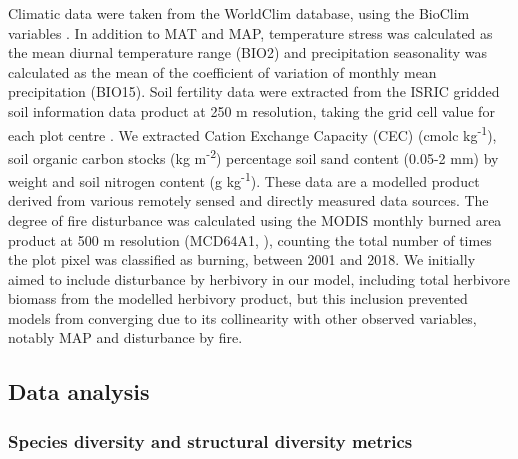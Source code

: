 \documentclass[11pt,a4paper]{article}
\begin{document}
Climatic data were taken from the WorldClim database, using the BioClim variables \citep{Fick2017}. In addition to MAT and MAP, temperature stress was calculated as the mean diurnal temperature range (BIO2) and precipitation seasonality was calculated as the mean of the coefficient of variation of monthly mean precipitation (BIO15). Soil fertility data were extracted from the ISRIC gridded soil information data product at 250 m resolution, taking the grid cell value for each plot centre \citep{Hengl2017}. We extracted Cation Exchange Capacity (CEC) (cmolc kg\textsuperscript{-1}), soil organic carbon stocks (kg m\textsuperscript{-2}) percentage soil sand content (0.05-2 mm) by weight and soil nitrogen content (g kg\textsuperscript{-1}). These data are a modelled product derived from various remotely sensed and directly measured data sources. The degree of fire disturbance was calculated using the MODIS monthly burned area product at 500 m resolution (MCD64A1, \citealt{MODIS_burn}), counting the total number of times the plot pixel was classified as burning, between 2001 and 2018. We initially aimed to include disturbance by herbivory in our model, including total herbivore biomass from the \citet{Hempson2017} modelled herbivory product, but this inclusion prevented models from converging due to its collinearity with other observed variables, notably MAP and disturbance by fire. 

\subsection{Data analysis}

\subsubsection{Species diversity and structural diversity metrics}
\end{document}
